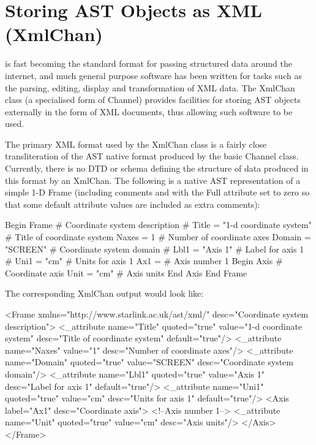 \documentclass[twoside,11pt]{starlink}
\begin{document}
\cleardoublepage
\section{\label{ss:xmlchan}Storing AST Objects as XML (XmlChan)}

is fast becoming the standard format for passing structured data around
the internet, and much general purpose software has been written for
tasks such as the parsing, editing, display and transformation of XML
data. The XmlChan class (a specialised form of Channel) provides
facilities for storing AST objects externally in the form of XML documents,
thus allowing such software to be used.

The primary XML format used by the XmlChan class is a fairly close
transliteration of the AST native format produced by the basic Channel
class. Currently, there is no DTD or schema defining the structure of data
produced in this format by an XmlChan. The following is a native AST
representation of a simple 1-D Frame (including comments and with the Full
attribute set to zero so that some default attribute values are included
as extra comments):

\small
\begin{terminalv}
 Begin Frame    # Coordinate system description
#   Title = "1-d coordinate system"     # Title of coordinate system
    Naxes = 1   # Number of coordinate axes
    Domain = "SCREEN"   # Coordinate system domain
#   Lbl1 = "Axis 1"     # Label for axis 1
#   Uni1 = "cm"         # Units for axis 1
    Ax1 =       # Axis number 1
       Begin Axis       # Coordinate axis
          Unit = "cm"   # Axis units
       End Axis
 End Frame
\end{terminalv}
\normalsize

The corresponding XmlChan output would look like:

\small
\begin{terminalv}
 <Frame xmlns="http://www.starlink.ac.uk/ast/xml/"
        desc="Coordinate system description">
    <_attribute name="Title" quoted="true" value="1-d coordinate system"
                desc="Title of coordinate system" default="true"/>
    <_attribute name="Naxes" value="1" desc="Number of coordinate axes"/>
    <_attribute name="Domain" quoted="true" value="SCREEN"
                desc="Coordinate system domain"/>
    <_attribute name="Lbl1" quoted="true" value="Axis 1"
                desc="Label for axis 1" default="true"/>
    <_attribute name="Uni1" quoted="true" value="cm"
                desc="Units for axis 1" default="true"/>
    <Axis label="Ax1" desc="Coordinate axis">
       <!--Axis number 1-->
       <_attribute name="Unit" quoted="true" value="cm" desc="Axis units"/>
    </Axis>
 </Frame>
\end{terminalv}
\normalsize
\end{document}
